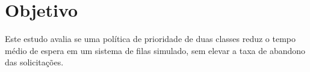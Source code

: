 \section{Objetivo}
Este estudo avalia se uma política de prioridade de duas classes reduz o tempo médio de espera em um sistema de filas simulado, sem elevar a taxa de abandono das solicitações.
